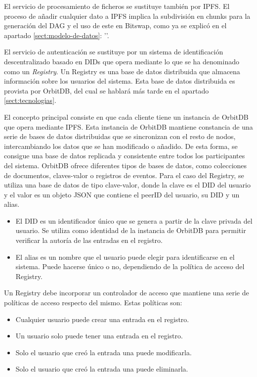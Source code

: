El servicio de procesamiento de ficheros se sustituye también por IPFS. El proceso de añadir cualquier dato a IPFS implica la subdivisión en chunks
para la generación del DAG y el uso de este en Bitswap, como ya se explicó en el apartado \ref{sect:modelo-de-datos}: ''.

El servicio de autenticación se sustituye por un sistema de identificación descentralizado basado en DIDs que opera mediante
lo que se ha denominado como un \textit{Registry}. Un Registry es una base de datos distribuida que almacena información sobre los usuarios del sistema.
Esta base de datos distribuida es provista por OrbitDB, del cual se hablará más tarde en el apartado \ref{sect:tecnologias}.

El concepto principal consiste
en que cada cliente tiene un instancia de OrbitDB que opera mediante IPFS. Esta instancia de OrbitDB mantiene constancia de una serie de bases de datos distribuidas que se sincronizan
con el resto de nodos, intercambiando los datos que se han modificado o añadido. De esta forma, se consigue una base de datos replicada y consistente entre todos los participantes del
sistema. OrbitDB ofrece diferentes tipos de bases de datos, como colecciones de documentos, claves-valor o registros de eventos. Para el caso del Registry, se utiliza una base de
datos de tipo clave-valor, donde la clave es el DID del usuario y el valor es un objeto JSON que contiene el peerID del usuario, su DID y un alias.
\begin{itemize}[noitemsep,after=\vspace{-0.4\baselineskip}]
  \item El DID es un identificador único que se genera a partir de la clave privada del usuario.
        Se utiliza como identidad de la instancia de OrbitDB para permitir verificar la autoría de las entradas en el registro.
  \item El alias es un nombre que el usuario puede elegir para identificarse en el sistema. Puede hacerse único o no, dependiendo de la política de acceso del Registry.
\end{itemize}

Un Registry debe incorporar un controlador de acceso que mantiene una serie de políticas de acceso respecto del mismo.
Estas políticas son:
\begin{itemize}[noitemsep,after=\vspace{-0.4\baselineskip}]
  \item Cualquier usuario puede crear una entrada en el registro.
  \item Un usuario solo puede tener una entrada en el registro.
  \item Solo el usuario que creó la entrada una puede modificarla.
  \item Solo el usuario que creó la entrada una puede eliminarla.
\end{itemize}


